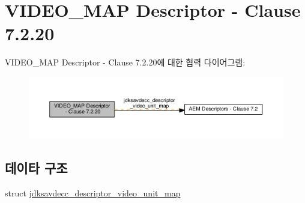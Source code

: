 \hypertarget{group__descriptor__video__map}{}\section{V\+I\+D\+E\+O\+\_\+\+M\+AP Descriptor -\/ Clause 7.2.20}
\label{group__descriptor__video__map}
V\+I\+D\+E\+O\+\_\+\+M\+AP Descriptor -\/ Clause 7.2.20에 대한 협력 다이어그램\+:
\nopagebreak
\begin{figure}[H]
\begin{center}
\leavevmode
\includegraphics[width=350pt]{group__descriptor__video__map}
\end{center}
\end{figure}
\subsection*{데이타 구조}
\begin{DoxyCompactItemize}
\item 
struct \hyperlink{structjdksavdecc__descriptor__video__unit__map}{jdksavdecc\+\_\+descriptor\+\_\+video\+\_\+unit\+\_\+map}
\end{DoxyCompactItemize}
